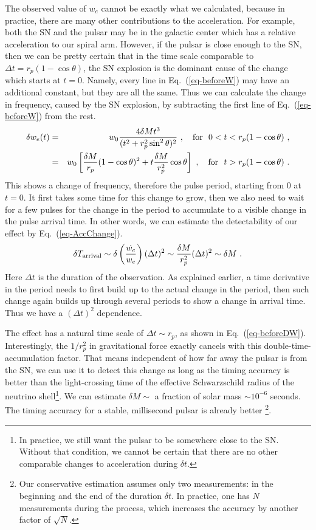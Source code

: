 \documentclass[aps,showpacs,onecolumn,floats,prd,superscriptaddress,nofootinbib]{revtex4}
\begin{document}
The observed value of $w_e$ cannot be exactly what we calculated, because in practice, there are many other contributions to the acceleration. For example, both the SN and the pulsar may be in the galactic center which has a relative acceleration to our spiral arm. However, if the pulsar is close enough to the SN, then we can be pretty certain that in the time scale comparable to $\Delta t = r_p(1-\cos\theta)$, the SN explosion is the dominant cause of the change which starts at $t=0$. Namely, every line in Eq.~(\ref{eq-beforeW}) may have an additional constant, but they are all the same. Thus we can calculate the change in frequency, caused by the SN explosion, by subtracting the first line of Eq.~(\ref{eq-beforeW}) from the rest.
\begin{eqnarray}
\delta w_e(t) &=& w_0 
\frac{4\delta M t^3}{(t^2 + r_p^2\sin^2\theta)^2} ~, 
\ \ \ {\rm for} \ \ 0 < t <  r_p(1 - \cos\theta)~, \label{eq-beforeDW} \\ \nonumber
&=& w_0 
\left[ \frac{\delta M}{r_p}(1-\cos\theta)^2 +  t \frac{\delta M}{r_p^2}\cos\theta \right]~,
\ \ \ {\rm for} \ \ t > r_p(1-\cos\theta)~.
\end{eqnarray}
This shows a change of frequency, therefore the pulse period, starting from $0$ at $t=0$. It first takes some time for this change to grow, then we also need to wait for a few pulses for the change in the period to accumulate to a visible change in the pulse arrival time. In other words, we can estimate the detectability of our effect by Eq.~(\ref{eq-AccChange}).
\begin{equation}
\delta T_{\rm arrival} \sim \delta\left(\frac{\dot{w_e}}{w_e}\right)(\Delta t)^2
\sim \frac{\delta M}{r_p^2} (\Delta t)^2 \sim \delta M~.
\end{equation}
Here $\Delta t$ is the duration of the observation. As explained earlier, a time derivative in the period needs to first build up to the actual change in the period, then such change again builds up through several periods to show a change in arrival time. Thus we have a $(\Delta t)^2$ dependence.

The effect has a natural time scale of $\Delta t\sim r_p$, as shown in Eq.~(\ref{eq-beforeDW}). Interestingly, the $1/r_p^2$ in gravitational force exactly cancels with this double-time-accumulation factor. That means independent of how far away the pulsar is from the SN, we can use it to detect this change as long as the timing accuracy is better than the light-crossing time of the effective Schwarzschild radius of the neutrino shell\footnote{In practice, we still want the pulsar to be somewhere close to the SN. Without that condition, we cannot be certain that there are no other comparable changes to acceleration during $\delta t$.}. We can estimate $\delta M\sim$ a fraction of solar mass $\sim10^{-6}$ seconds. The timing accuracy for a stable, millisecond pulsar is already better \cite{PulsarTiming}\footnote{Our conservative estimation assumes only two measurements: in the beginning and the end of the duration $\delta t$. In practice, one has $N$ measurements during the process, which increases the accuracy by another factor of $\sqrt{N}$.}.
\end{document}
